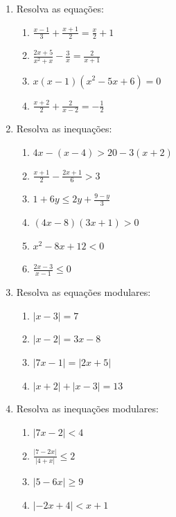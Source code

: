 \documentclass[oneside,a4paper,12pt]{article}
\begin{document}
\begin{enumerate}

	\item Resolva as equações:
	\begin{multicols}{2}
	\begin{enumerate}
		\item $\frac{x-1}{3} + \frac{x+1}{2} = \frac{x}{2} + 1$
		\item $ \frac{2x+5}{x^{2}+x}- \frac{3}{x} = \frac{2}{x+1}$
		\item $ x(x-1)(x^{2}-5x+6) = 0$
		\item $ \frac{x+2}{2}+\frac{2}{x-2}= - \frac{1}{2}$
	\end{enumerate}
	\end{multicols}

	\item Resolva as inequações:
	\begin{multicols}{2}
	\begin{enumerate}
		\item $4x - (x-4) > 20 - 3(x+2) $
		\item $ \frac{x+1}{2} - \frac{2x +1}{6} > 3$
		\item $ 1 + 6y \leq 2y + \frac{9-y}{3}$
		\item $ (4x - 8)(3x+1) > 0 $
		\item $ x^{2} - 8x + 12 < 0 $
		\item $ \frac{2x - 3}{x-1} \leq 0 $
	\end{enumerate}
	\end{multicols}

	\item Resolva as equações modulares:
	\begin{multicols}{2}
	\begin{enumerate}
		\item $|x-3| = 7$
		\item $|x-2| = 3x -8 $
		\item $|7x-1| = |2x+5| $
		\item $|x+2| + |x-3| = 13$
	\end{enumerate}
	\end{multicols}

	\item Resolva as inequações modulares:
	\begin{multicols}{2}
	\begin{enumerate}
		\item $|7x -2| < 4 $
		\item $ \frac{|7 - 2x|}{|4+x|} \leq 2$
		\item $|5-6x| \geq 9$
		\item $|-2x + 4| < x+1$
	\end{enumerate}
	\end{multicols}


\end{enumerate}
\end{document}
